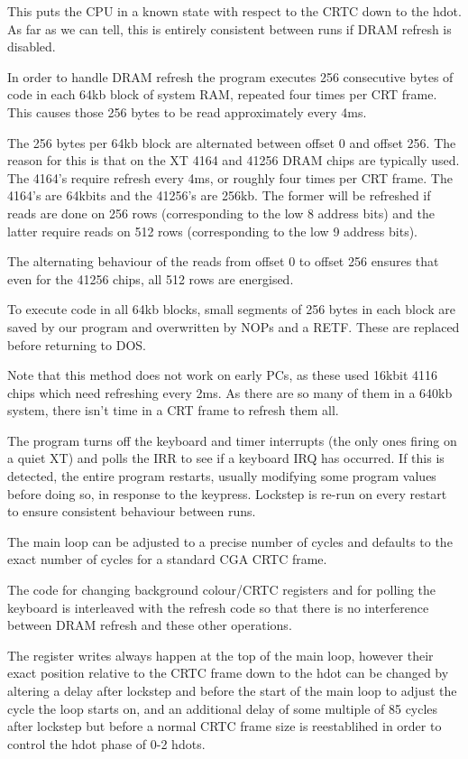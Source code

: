 \documentclass[a4paper,10pt]{amsart}
\begin{document}
This puts the CPU in a known state with respect to the CRTC down to the hdot.
As far as we can tell, this is entirely consistent between runs if DRAM refresh
is disabled.

In order to handle DRAM refresh the program executes 256 consecutive bytes of
code in each 64kb block of system RAM, repeated four times per CRT frame. This
causes those 256 bytes to be read approximately every 4ms.

The 256 bytes per 64kb block are alternated between offset 0 and offset 256.
The reason for this is that on the XT 4164 and 41256 DRAM chips are typically
used. The 4164's require refresh every 4ms, or roughly four times per CRT
frame. The 4164's are 64kbits and the 41256's are 256kb. The former will be
refreshed if reads are done on 256 rows (corresponding to the low 8 address
bits) and the latter require reads on 512 rows (corresponding to the low 9
address bits).

The alternating behaviour of the reads from offset 0 to offset 256 ensures
that even for the 41256 chips, all 512 rows are energised.

To execute code in all 64kb blocks, small segments of 256 bytes in each block
are saved by our program and overwritten by NOPs and a RETF. These are replaced
before returning to DOS.

Note that this method does not work on early PCs, as these used 16kbit 4116
chips which need refreshing every 2ms. As there are so many of them in a 640kb
system, there isn't time in a CRT frame to refresh them all.

The program turns off the keyboard and timer interrupts (the only ones firing
on a quiet XT) and polls the IRR to see if a keyboard IRQ has occurred. If this
is detected, the entire program restarts, usually modifying some program values
before doing so, in response to the keypress. Lockstep is re-run on every
restart to ensure consistent behaviour between runs.

The main loop can be adjusted to a precise number of cycles and defaults to the
exact number of cycles for a standard CGA CRTC frame.

The code for changing background colour/CRTC registers and for polling the
keyboard is interleaved with the refresh code so that there is no interference
between DRAM refresh and these other operations.

The register writes always happen at the top of the main loop, however their
exact position relative to the CRTC frame down to the hdot can be changed
by altering a delay after lockstep and before the start of the main loop to
adjust the cycle the loop starts on, and an additional delay of some multiple
of 85 cycles after lockstep but before a normal CRTC frame size is reestablihed
in order to control the hdot phase of 0-2 hdots.
\end{document}
